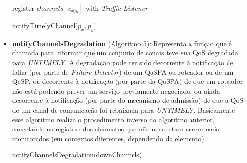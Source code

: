 \begin{itemize}
\begin{algorithm}[H]
	register $channels[c_{x/y}]$ with \textit{Traffic Listener}\;
\caption{notifyTimelyChannel($p_{x}, p_{y}$)}
\end{algorithm}

\item \textbf{notifyChannelsDegradation} (Algoritmo 5): Representa a função que é chamada para informar que um conjunto de canais teve sua QoS degradada para \textit{UNTIMELY}. A degradação pode ter sido decorrente à notificação de falha (por parte de \textit{Failure Detector}) de um QoSPA ou roteador ou de um QoSP, ou decorrente à notificação (por parte do QoSPA) de que um roteador não está podendo prover um serviço previamente negociado, ou ainda decorrente à notificação (por parte do mecanismo de admissão) de que a QoS de um canal de comunicação foi rebaixada para \textit{UNTIMELY}. Basicamente esse algoritmo realiza o procedimento inverso do algoritmo anterior, cancelando os registros dos elementos que não necessitam serem mais monitorados (em contextos diferentes, dependendo do elemento).

\begin{algorithm}[H]
	
\caption{notifyChannelsDegradation(downChannels)}
\end{algorithm}


\end{itemize}
